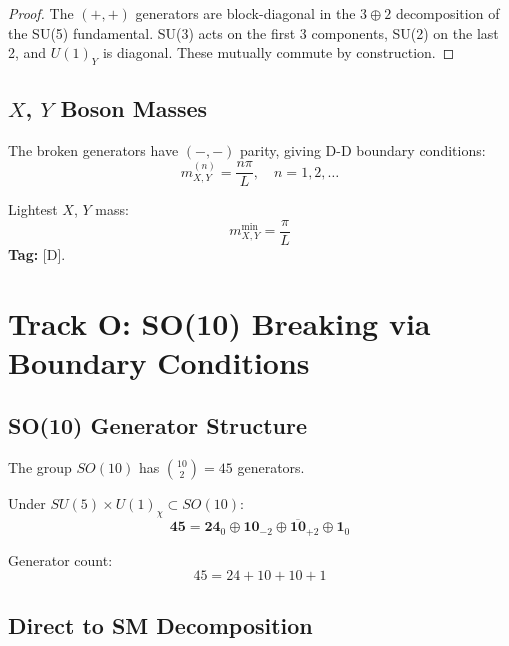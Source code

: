 \documentclass[11pt,a4paper]{article}
\begin{document}
\begin{proof}
The $(+,+)$ generators are block-diagonal in the $3 \oplus 2$ decomposition of the
SU(5) fundamental. SU(3) acts on the first 3 components, SU(2) on the last 2, and
$U(1)_Y$ is diagonal. These mutually commute by construction.
\end{proof}

\subsection{$X$, $Y$ Boson Masses}

The broken generators have $(-, -)$ parity, giving D-D boundary conditions:
\begin{equation}
  m_{X,Y}^{(n)} = \frac{n\pi}{L}, \quad n = 1, 2, \ldots
  \label{eq:xy-masses}
\end{equation}

Lightest $X$, $Y$ mass:
\begin{equation}
  m_{X,Y}^{\text{min}} = \frac{\pi}{L}
  \label{eq:xy-min-mass}
\end{equation}
\textbf{Tag:} [D].

\section{Track O: SO(10) Breaking via Boundary Conditions}
\label{sec:track-o}

\subsection{SO(10) Generator Structure}

The group $SO(10)$ has $\binom{10}{2} = 45$ generators.

Under $SU(5) \times U(1)_\chi \subset SO(10)$:
\begin{equation}
  \mathbf{45} = \mathbf{24}_0 \oplus \mathbf{10}_{-2} \oplus \mathbf{\overline{10}}_{+2}
    \oplus \mathbf{1}_0
  \label{eq:so10-su5-decomp}
\end{equation}

Generator count:
\begin{equation}
  45 = 24 + 10 + 10 + 1
  \label{eq:so10-count}
\end{equation}

\subsection{Direct to SM Decomposition}
\end{document}
